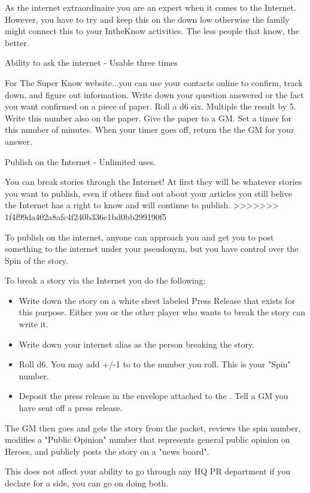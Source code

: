 \documentclass[green]{LRSguildcamp1}
\begin{document}
\name{\gInternetPR{}}

As \cTween{} the internet extraordinaire you are an expert when it comes to the Internet. However, you have to try and keep this on the down low otherwise the family might connect this to your IntheKnow activities. The less people that know, the better. 

Ability to ask the internet - Usable three times

For The Super Know website...you can use your contacts online to confirm, track down, and figure out information. Write down your question answered or the fact you want confirmed on a piece of paper. Roll a d6 six. Multiple the result by 5. Write this number also on the paper. Give the paper to a GM. Set a timer for this number of minutes. When your timer goes off, return the the GM for your answer. 

Publish on the Internet - Unlimited uses.

You can break stories through the Internet! At first they will be whatever stories you want to publish, even if others find out about your articles you still belive the Internet has a right to know and will continue to publish. 
>>>>>>> 1f4f99da402a8afc4f240b336c1bd0bb299190f5

To publish on the internet, anyone can approach you and get you to post something to the internet under your pseudonym, but you have control over the Spin of the story. 

To break a story via the Internet you do the following:
\begin {itemize}
\item Write down the story on a white sheet labeled Press Release that exists for this purpose. Either you or the other player who wants to break the story can write it. 
\item Write down your internet alias as the person breaking the story.  
\item Roll d6.  You may add +/-1 to to the number you roll. This is your "Spin" number.
\item Deposit the press release in the envelope attached to the \sComputer{}. 
Tell a GM you have sent off a press release.
\end{itemize}

The GM then goes and gets the story from the packet, reviews the spin number, modifies a "Public Opinion" number that represents general public opinion on Heroes, and publicly posts the story on a "news board". 


This does not affect your ability to go through any HQ PR department if you declare for a side, you can go on doing both. 
\end{document}
